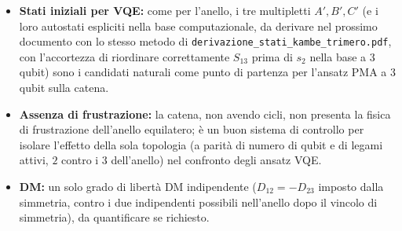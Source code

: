 \documentclass[11pt,a4paper]{article}
\begin{document}
\begin{itemize}
\item \textbf{Stati iniziali per VQE:} come per l'anello, i tre multipletti
$A',B',C'$ (e i loro autostati espliciti nella base computazionale, da
derivare nel prossimo documento con lo stesso metodo di
\texttt{derivazione\_stati\_kambe\_trimero.pdf}, con l'accortezza di
riordinare correttamente $S_{13}$ prima di $s_2$ nella base a 3 qubit)
sono i candidati naturali come punto di partenza per l'ansatz PMA a 3 qubit
sulla catena.
\item \textbf{Assenza di frustrazione:} la catena, non avendo cicli, non
presenta la fisica di frustrazione dell'anello equilatero; è un buon
sistema di controllo per isolare l'effetto della sola topologia (a parità
di numero di qubit e di legami attivi, $2$ contro i $3$ dell'anello) nel
confronto degli ansatz VQE.
\item \textbf{DM:} un solo grado di libertà DM indipendente
($D_{12}=-D_{23}$ imposto dalla simmetria, contro i due indipendenti
possibili nell'anello dopo il vincolo di simmetria), da quantificare se
richiesto.
\end{itemize}
\end{document}
